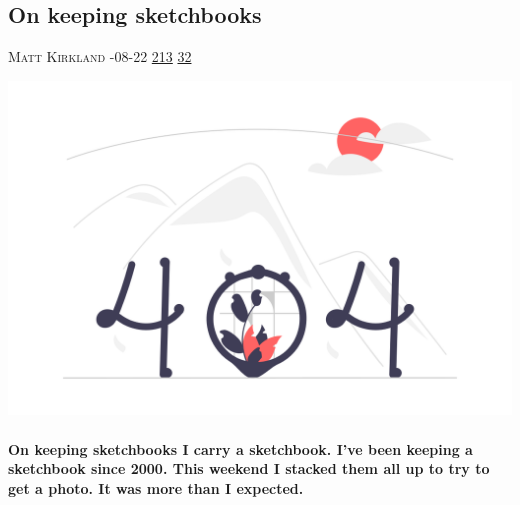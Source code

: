 \documentclass[10pt,a4paper]{article}
\begin{document}
\begin{multicols*}{2}
\begin{minipage}{\linewidth}
\subsection{On keeping sketchbooks}
\textsc{\footnotesize
{\scriptsize\faUser}\space 
Matt Kirkland 
{\scriptsize\faCalendar}-08-22 
{\scriptsize\faThumbsOUp}\space 
\href{http://news.ycombinator.com/item?id=37227606\&utm\_term=comment}{213} 
{\scriptsize\faComments}\space 
\href{http://news.ycombinator.com/item?id=37227606\&utm\_term=comment}{32} 
}
\par\medskip\noindent
\href{https://attainablefelicity.mattkirkland.com/20230822/Sketchbooks.html?utm\_source=hackernewsletter\&utm\_medium=email\&utm\_term=design}{
    \includegraphics[width=0.99\linewidth]{notfound.png}
}
\end{minipage}
\paragraph{}
\textbf{On keeping sketchbooks
I carry a sketchbook. I’ve been keeping a sketchbook since 2000. This weekend I stacked them all up to try to get a photo. It was more than I expected.}
\paragraph{}


\end{multicols*}
\end{document}
